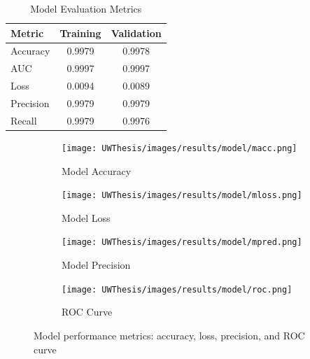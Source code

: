 \documentclass [11pt, proquest] {uwthesis}[2020/02/24]
\begin{document}
\begin{table}[H]
\centering
\begin{tabular}{lcc}
\hline
\textbf{Metric} & \textbf{Training} & \textbf{Validation} \\
\hline
Accuracy & 0.9979 & 0.9978 \\
AUC & 0.9997 & 0.9997 \\
Loss & 0.0094 & 0.0089 \\
Precision & 0.9979 & 0.9979 \\
Recall & 0.9979 & 0.9976 \\
\hline
\end{tabular}
\caption{Model Evaluation Metrics}
\label{model-evaluation-metrics}
\end{table}

\begin{figure}[H]
  \centering
  \begin{subfigure}[b]{0.48\textwidth}
    \texttt{[image: UWThesis/images/results/model/macc.png]}
    \caption{Model Accuracy}
    \label{fig:image1}
  \end{subfigure}
  \hspace{0.02\textwidth}
  \begin{subfigure}[b]{0.48\textwidth}
    \texttt{[image: UWThesis/images/results/model/mloss.png]}
    \caption{Model Loss}
    \label{fig:image2}
  \end{subfigure}

  \vspace{0.3cm}

  \begin{subfigure}[b]{0.48\textwidth}
    \texttt{[image: UWThesis/images/results/model/mpred.png]}
    \caption{Model Precision}
    \label{fig:image3}
  \end{subfigure}
  \hspace{0.02\textwidth}
  \begin{subfigure}[b]{0.48\textwidth}
    \texttt{[image: UWThesis/images/results/model/roc.png]}
    \caption{ROC Curve}
    \label{fig:image4}
  \end{subfigure}

  \caption{Model performance metrics: accuracy, loss, precision, and ROC curve}
  \label{fig:model_metrics_quadrant}
\end{figure}
\end{document}
